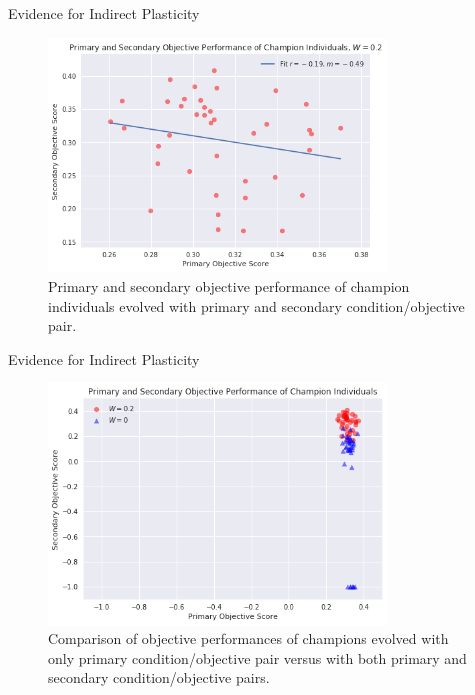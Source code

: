 \begin{frame}{Evidence for Indirect Plasticity}
\begin{figure}
    \centering
    \includegraphics[width=0.8\textwidth]{img/primary_secondary_w02}
 	\captionsetup{singlelinecheck=off,justification=raggedright}
  	\caption{Primary and secondary objective performance of champion individuals evolved with primary and secondary condition/objective pair.}
    \label{fig:ev_w0}
\end{figure}
\end{frame}

\begin{frame}{Evidence for Indirect Plasticity}
\begin{figure}
    \centering
    \includegraphics[width=0.8\textwidth]{img/scatter_indirect}
 	\captionsetup{singlelinecheck=off,justification=raggedright}
  	\caption{Comparison of objective performances of champions evolved with only primary condition/objective pair versus with both primary and secondary condition/objective pairs.}
    \label{fig:es_p0}
\end{figure}
\end{frame}

